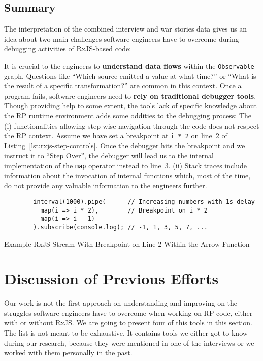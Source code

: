 \documentclass[12pt,a4paper]{article}
\begin{document}
\subsection{Summary}

The interpretation of the combined interview and war stories data gives us an idea about two main challenges software engineers have to overcome during debugging activities of RxJS-based code:

It is crucial to the engineers to \textbf{understand data flows}  within the \texttt{Observable} graph. Questions like ``Which source emitted a value at what time?'' or ``What is the result of a specific transformation?'' are common in this context. Once a program fails, software engineers need to \textbf{rely on traditional debugger tools}. Though providing help to some extent, the tools lack of specific knowledge about the RP runtime environment adds some oddities to the debugging process: The (i) functionalities allowing step-wise navigation through the code does not respect the RP context. Assume we have set a breakpoint at \texttt{i * 2} on line~2 of Listing~\ref{lst:rxjs-step-controls}. Once the debugger hits the breakpoint and we instruct it to ``Step Over'', the debugger will lead us to the internal implementation of the \texttt{map} operator instead to line~3. (ii) Stack traces include information about the invocation of internal functions which, most of the time, do not provide any valuable information to the engineers further.

\begin{listing}[H]
	\begin{verbatim}
		interval(1000).pipe(      // Increasing numbers with 1s delay
		  map(i => i * 2),        // Breakpoint on i * 2
		  map(i => i - 1)
		).subscribe(console.log); // -1, 1, 3, 5, 7, ...
	\end{verbatim}
	\caption{Example RxJS Stream With Breakpoint on Line 2 Within the Arrow Function}
	\label{lst:rxjs-step-controls}
\end{listing}


\section{Discussion of Previous Efforts}
\label{sec:discussion}

Our work is not the first approach on understanding and improving on the struggles software engineers have to overcome when working on RP code, either with or without RxJS. We are going to present four of this tools in this section. The list is not meant to be exhaustive. It contains tools we either got to know during our research, because they were mentioned in one of the interviews or we worked with them personally in the past.
\end{document}
